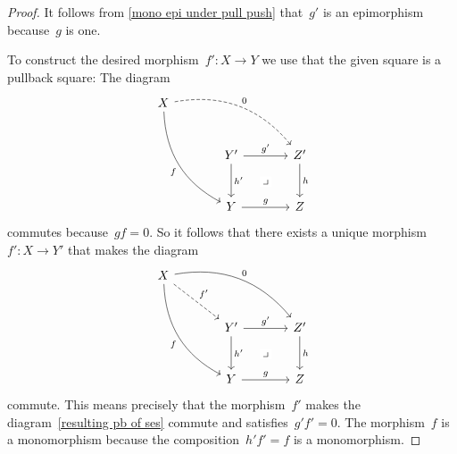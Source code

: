 \begin{proof}
  It follows from \cref{mono epi under pull push} that~$g'$ is an epimorphism because~$g$ is one.
  
  To construct the desired morphism~$f' \colon X \to Y$ we use that the given square is a pullback square:
  The diagram
  \[
    \begin{tikzcd}[sep = large]
        X
        \arrow[dashed, bend left]{drr}[above right]{0}
        \arrow[bend right]{ddr}[below left]{f}
      & {}
      & {}
      \\
        {}
      & Y'
        \arrow{r}[above]{g'}
        \arrow{d}[right]{h'}
        \arrow[phantom]{dr}[description]{\pb}
      & Z'
        \arrow{d}[right]{h}
      \\
        {}
      & Y
        \arrow{r}[above]{g}
      & Z
    \end{tikzcd}
  \]
  commutes because~$gf = 0$.
  So it follows that there exists a unique morphism~$f' \colon X \to Y'$ that makes the diagram
  \[
    \begin{tikzcd}[sep = large]
        X
        \arrow[bend left]{drr}[above right]{0}
        \arrow[dashed]{dr}[above right]{f'}
        \arrow[bend right]{ddr}[below left]{f}
      & {}
      & {}
      \\
        {}
      & Y'
        \arrow{r}[above]{g'}
        \arrow{d}[right]{h'}
        \arrow[phantom]{dr}[description]{\pb}
      & Z'
        \arrow{d}[right]{h}
      \\
        {}
      & Y
        \arrow{r}[above]{g}
      & Z
    \end{tikzcd}
  \]
  commute.
  This means precisely that the morphism~$f'$ makes the diagram~\eqref{resulting pb of ses} commute and satisfies~$g' f' = 0$.
  The morphism~$f$ is a monomorphism because the composition~$h' f' = f$ is a monomorphism.
  

\end{proof}

